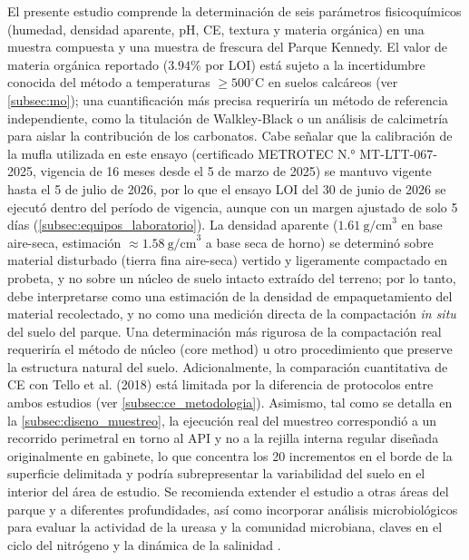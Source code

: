 \documentclass[fleqn]{jaes}
\begin{document}
El presente estudio comprende la determinación de seis parámetros fisicoquímicos (humedad, densidad aparente, pH, CE, textura y materia orgánica) en una muestra compuesta y una muestra de frescura del Parque Kennedy. El valor de materia orgánica reportado ($3.94\%$ por LOI) está sujeto a la incertidumbre conocida del método a temperaturas $\geq 500^\circ\text{C}$ en suelos calcáreos (ver \cref{subsec:mo}); una cuantificación más precisa requeriría un método de referencia independiente, como la titulación de Walkley-Black o un análisis de calcimetría para aislar la contribución de los carbonatos. Cabe señalar que la calibración de la mufla utilizada en este ensayo (certificado METROTEC N.° MT-LTT-067-2025, vigencia de 16 meses desde el 5 de marzo de 2025) se mantuvo vigente hasta el 5 de julio de 2026, por lo que el ensayo LOI del 30 de junio de 2026 se ejecutó dentro del período de vigencia, aunque con un margen ajustado de solo 5 días (\cref{subsec:equipos_laboratorio}). La densidad aparente ($1.61~\text{g/cm}^3$ en base aire-seca, estimación $\approx 1.58~\text{g/cm}^3$ a base seca de horno) se determinó sobre material disturbado (tierra fina aire-seca) vertido y ligeramente compactado en probeta, y no sobre un núcleo de suelo intacto extraído del terreno; por lo tanto, debe interpretarse como una estimación de la densidad de empaquetamiento del material recolectado, y no como una medición directa de la compactación \textit{in situ} del suelo del parque. Una determinación más rigurosa de la compactación real requeriría el método de núcleo (core method) u otro procedimiento que preserve la estructura natural del suelo. Adicionalmente, la comparación cuantitativa de CE con Tello et al. (2018) está limitada por la diferencia de protocolos entre ambos estudios (ver \cref{subsec:ce_metodologia}). Asimismo, tal como se detalla en la \cref{subsec:diseno_muestreo}, la ejecución real del muestreo correspondió a un recorrido perimetral en torno al API y no a la rejilla interna regular diseñada originalmente en gabinete, lo que concentra los 20 incrementos en el borde de la superficie delimitada y podría subrepresentar la variabilidad del suelo en el interior del área de estudio. Se recomienda extender el estudio a otras áreas del parque y a diferentes profundidades, así como incorporar análisis microbiológicos para evaluar la actividad de la ureasa y la comunidad microbiana, claves en el ciclo del nitrógeno y la dinámica de la salinidad \cite{McGuire2019}.
\end{document}
